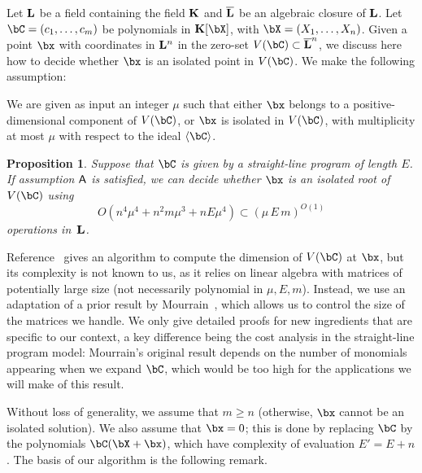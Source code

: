 \documentclass[12pt]{article}
\newtheorem{proposition}[definition]{Proposition}
\begin{document}
Let $\mathbf{L}$ be a field containing the field $\mathbf{K}$ and $\overline{\mathbf{L}}$ be an
algebraic closure of $\mathbf{L}$.  Let $\bC=(c_1,\dots,c_m)$ be polynomials
in $\KK[\bX]$, with $\bX=(X_1,\dots,X_n)$. Given a point $\bx$ with
coordinates in $\mathbf{L}^n$ in the zero-set $V(\bC)\subset \LLbar^n$, we
discuss here how to decide whether $\bx$ is an isolated point in
$V(\bC)$. We make the following assumption:
\begin{description}[leftmargin=*]
\item [$\assH.$] We are given as input an integer $\mu$ such that
 either $\bx$ belongs to a positive-dimensional component of $V(\bC)$,
 or $\bx$ is isolated in $V(\bC)$, with multiplicity at most $\mu$
  with respect to the ideal $\langle \bC\rangle$.
\end{description}

\begin{proposition}\label{prop:testisolated}
  Suppose that $\bC$ is given by a straight-line program of length $E$.
  If assumption $\mathsf{A}$ is satisfied, we can decide whether $\bx$ is an
  isolated root of $V(\bC)$ using 
$$O(n^4 \mu^4 + n^2 m \mu^3 + n E \mu^4) \subset (\mu\,E\,m)^{O(1)}$$ operations in~$\mathbf{L}$.
\end{proposition}
Reference~\cite{BaHaPeSo09} gives an algorithm to compute the
dimension of $V(\bC)$ at $\bx$, but its complexity is not known to us,
as it relies on linear algebra with matrices of potentially large size
(not necessarily polynomial in $\mu,E,m$).  Instead, we use an
adaptation of a prior result by Mourrain~\cite{Mourrain97}, which
allows us to control the size of the matrices we handle. We only give
detailed proofs for new ingredients that are specific to our context,
a key difference being the cost analysis in the straight-line program
model: Mourrain's original result depends on the number of monomials
appearing when we expand $\bC$, which would be too high for the
applications we will make of this result.

Without loss of generality, we assume that $m\ge n$ (otherwise, $\bx$
cannot be an isolated solution). We also assume that $\bx=0$; this is
done by replacing $\bC$ by the polynomials $\bC(\bX+\bx)$, which have
complexity of evaluation $E'=E+n$.  The basis of our algorithm is the
following remark.
\end{document}
